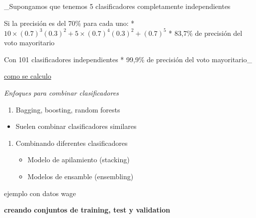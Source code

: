 \documentclass[
]{article}
\providecommand{\tightlist}{%
  \setlength{\itemsep}{0pt}\setlength{\parskip}{0pt}}
\begin{document}
\_Supongamos que tenemos 5 clasificadores completamente independientes

Si la precisión es del 70\% para cada uno: *
\(10\times(0.7)^3(0.3)^2+5\times(0.7)^4(0.3)^2+(0.7)^5\) * 83,7\% de
precisión del voto mayoritario

Con 101 clasificadores independientes * 99,9\% de precisión del voto
mayoritario\_

\href{https://github.com/lgreski/datasciencectacontent/blob/master/markdown/pml-combiningPredictorsBinomial.md}{como
se calculo}

\emph{Enfoques para combinar clasificadores}

\begin{enumerate}
\def\labelenumi{\arabic{enumi}.}
\tightlist
\item
  Bagging, boosting, random forests
\end{enumerate}

\begin{itemize}
\tightlist
\item
  Suelen combinar clasificadores similares
\end{itemize}

\begin{enumerate}
\def\labelenumi{\arabic{enumi}.}
\setcounter{enumi}{1}
\tightlist
\item
  Combinando diferentes clasificadores

  \begin{itemize}
  \tightlist
  \item
    Modelo de apilamiento (stacking)
  \item
    Modelos de ensamble (ensembling)
  \end{itemize}
\end{enumerate}

ejemplo con datos wage

\textbf{creando conjuntos de training, test y validation}
\end{document}
